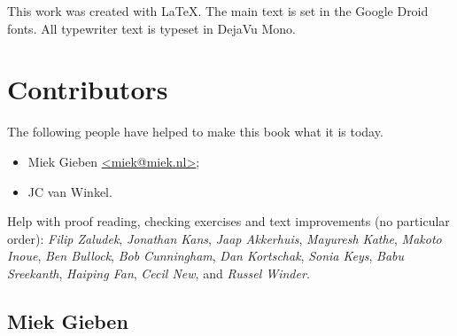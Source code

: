 \noindent{}This work was created with \LaTeX. The main text is set in
the Google Droid fonts. All typewriter text is typeset in DejaVu Mono.

\section{Contributors}
The following people have helped to make this book what it is today.
\begin{itemize}
\item{Miek Gieben \qquad\url{<miek@miek.nl>}};
\item{JC van Winkel}.
\end{itemize}

Help with proof reading, checking exercises and text improvements (no
particular order):
\emph{Filip Zaludek},
\emph{Jonathan Kans},
\emph{Jaap Akkerhuis},
\emph{Mayuresh Kathe},
\emph{Makoto Inoue},
\emph{Ben Bullock},
\emph{Bob Cunningham},
\emph{Dan Kortschak},
\emph{Sonia Keys},
\emph{Babu Sreekanth},
\emph{Haiping Fan},
\emph{Cecil New},
and \emph{Russel Winder}.

\subsection{Miek Gieben}

